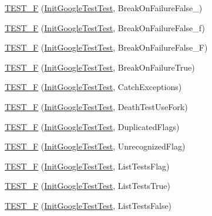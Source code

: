 \begin{DoxyCompactItemize}
\item 
\hyperlink{namespacetesting_abd2b3ac615374fbe560ba35be4c4e928}{\-T\-E\-S\-T\-\_\-\-F} (\hyperlink{classtesting_1_1InitGoogleTestTest}{\-Init\-Google\-Test\-Test}, \-Break\-On\-Failure\-False\-\_)
\item 
\hyperlink{namespacetesting_abb038e044a4f2142414624e482b48eeb}{\-T\-E\-S\-T\-\_\-\-F} (\hyperlink{classtesting_1_1InitGoogleTestTest}{\-Init\-Google\-Test\-Test}, \-Break\-On\-Failure\-False\-\_\-f)
\item 
\hyperlink{namespacetesting_aec19373865e49dbd1fe7f22c8db4a256}{\-T\-E\-S\-T\-\_\-\-F} (\hyperlink{classtesting_1_1InitGoogleTestTest}{\-Init\-Google\-Test\-Test}, \-Break\-On\-Failure\-False\-\_\-\-F)
\item 
\hyperlink{namespacetesting_aaf881d7ee8cfa238e9a66d0562937fde}{\-T\-E\-S\-T\-\_\-\-F} (\hyperlink{classtesting_1_1InitGoogleTestTest}{\-Init\-Google\-Test\-Test}, \-Break\-On\-Failure\-True)
\item 
\hyperlink{namespacetesting_af59442310531cd96d8aa3ce5acb2d025}{\-T\-E\-S\-T\-\_\-\-F} (\hyperlink{classtesting_1_1InitGoogleTestTest}{\-Init\-Google\-Test\-Test}, \-Catch\-Exceptions)
\item 
\hyperlink{namespacetesting_aa5259681257cd3654f34dc81212c82bc}{\-T\-E\-S\-T\-\_\-\-F} (\hyperlink{classtesting_1_1InitGoogleTestTest}{\-Init\-Google\-Test\-Test}, \-Death\-Test\-Use\-Fork)
\item 
\hyperlink{namespacetesting_a34b640eb46cf4189bed01f18d42d3277}{\-T\-E\-S\-T\-\_\-\-F} (\hyperlink{classtesting_1_1InitGoogleTestTest}{\-Init\-Google\-Test\-Test}, \-Duplicated\-Flags)
\item 
\hyperlink{namespacetesting_a1572c861f65ca8d5dfb61246a32a2799}{\-T\-E\-S\-T\-\_\-\-F} (\hyperlink{classtesting_1_1InitGoogleTestTest}{\-Init\-Google\-Test\-Test}, \-Unrecognized\-Flag)
\item 
\hyperlink{namespacetesting_a1d111e67e0c6411085ff6d0911f50d18}{\-T\-E\-S\-T\-\_\-\-F} (\hyperlink{classtesting_1_1InitGoogleTestTest}{\-Init\-Google\-Test\-Test}, \-List\-Tests\-Flag)
\item 
\hyperlink{namespacetesting_a000181c6b1ac347a3d7797324808ea8d}{\-T\-E\-S\-T\-\_\-\-F} (\hyperlink{classtesting_1_1InitGoogleTestTest}{\-Init\-Google\-Test\-Test}, \-List\-Tests\-True)
\item 
\hyperlink{namespacetesting_acc2334b947370b550b7d6241e0d34124}{\-T\-E\-S\-T\-\_\-\-F} (\hyperlink{classtesting_1_1InitGoogleTestTest}{\-Init\-Google\-Test\-Test}, \-List\-Tests\-False)

\end{DoxyCompactItemize}
